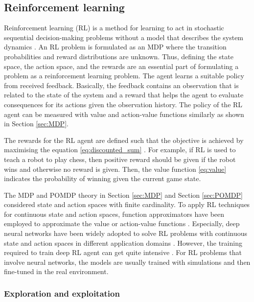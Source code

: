 \documentclass[english, 12pt, a4paper, elec, utf8, a-1b, online]{aaltothesis}
\begin{document}
\subsection{Reinforcement learning} \label{sec:RL}

Reinforcement learning (RL) is a method for learning to act in stochastic sequential decision-making problems without a model that describes the system dynamics \cite{Sutton2018}. 
An RL problem is formulated as an MDP where the transition probabilities and reward distributions are unknown. 
Thus, defining the state space, the action space, and the rewards are an essential part of formulating a problem as a reinforcement learning problem.
The agent learns a suitable policy from received feedback. 
Basically, the feedback contains an observation that is related to the state of the system and a reward that helps the agent to evaluate consequences for its actions given the observation history. 
The policy of the RL agent can be measured with value and action-value functions similarly as shown in Section \ref{sec:MDP}.

The rewards for the RL agent are defined such that the objective is achieved by maximising the equation \eqref{eq:discounted_sum} \cite{Sutton2018}.
For example, if RL is used to teach a robot to play chess, then positive reward should be given if the robot wins and otherwise no reward is given.
Then, the value function \eqref{eq:value} indicates the probability of winning given the current game state.

The MDP and POMDP theory in Section \ref{sec:MDP} and Section \ref{sec:POMDP} considered state and action spaces with finite cardinality. 
To apply RL techniques for continuous state and action spaces, function approximators have been employed to approximate the value or action-value functions \cite{Sutton2018}. 
Especially, deep neural networks have been widely adopted to solve RL problems with continuous state and action spaces in different application domains \cite{Zhang2018, Luong2018}.
However, the training required to train deep RL agent can get quite intensive \cite{Irpan2018}.
For RL problems that involve neural networks, the models are usually trained with simulations and then fine-tuned in the real environment.

\subsubsection{Exploration and exploitation}
\end{document}
